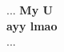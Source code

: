 \documentclass{article}
\begin{document}
...
\textbf{\huge My U \\}
\vspace{1cm}
\textbf{\Large ayy lmao \\}
...
\end{document}
